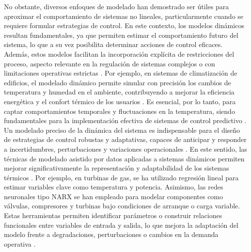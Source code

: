 \documentclass[11pt]{report}
\begin{document}
No obstante, diversos enfoques de modelado han demostrado ser útiles para aproximar el comportamiento de sistemas no lineales, particularmente cuando se requiere formular estrategias de control. En este contexto, los modelos dinámicos resultan fundamentales, ya que permiten estimar el comportamiento futuro del sistema, lo que a su vez posibilita determinar acciones de control eficaces. Además, estos modelos facilitan la incorporación explícita de restricciones del proceso, aspecto relevante en la regulación de sistemas complejos o con limitaciones operativas estrictas \cite{Schwenzer2021mpc}. Por ejemplo, en sistemas de climatización de edificios, el modelado dinámico permite simular con precisión los cambios de temperatura y humedad en el ambiente, contribuyendo a mejorar la eficiencia energética y el confort térmico de los usuarios \cite{LI2025135822}. Es esencial, por lo tanto, para captar comportamientos temporales y fluctuaciones en la temperatura, siendo fundamentales para la implementación efectiva de sistemas de control predictivo \cite{Fick2025}. 
Un modelado preciso de la dinámica del sistema es indispensable para el diseño de estrategias de control robustas y adaptativas, capaces de anticipar y responder a incertidumbres, perturbaciones y variaciones operacionales \cite{Lv2025RMPCDeepLearning}. En este sentido, las técnicas de modelado asistido por datos aplicadas a sistemas dinámicos permiten mejorar significativamente la representación y adaptabilidad de los sistemas térmicos \cite{zhou2024review}. Por ejemplo, en turbinas de gas, se ha utilizado regresión lineal para estimar variables clave como temperatura y potencia. Asimismo, las redes neuronales tipo NARX se han empleado para modelar componentes como válvulas, compresores y turbinas bajo condiciones de arranque o carga variable. Estas herramientas permiten identificar parámetros o construir relaciones funcionales entre variables de entrada y salida, lo que mejora la adaptación del modelo frente a degradaciones, perturbaciones o cambios en la demanda operativa \cite{zhou2024review}.
\end{document}
